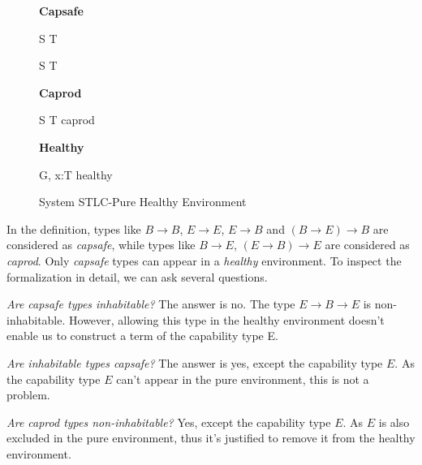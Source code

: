 \begin{figure}[h]
\begin{framed}

\setlength{\columnseprule}{0.4pt}
\begin{multicols}{2}

\textbf{Capsafe}


{ S \to T \quad {} }

{ S \to T \quad {} }

\columnbreak

\textbf{Caprod}


{ S \to T \quad caprod }

\textbf{Healthy}


{ G, \; x:T \quad healthy }


\end{multicols}
\end{framed}

\caption{System STLC-Pure Healthy Environment}
\label{fig:stlc-pure-healthy-definition}
\end{figure}

In the definition, types like $B \to B$, $E \to E$, $E \to B$ and
$(B \to E) \to B$ are considered as \emph{capsafe}, while types like
$B \to E$, $(E \to B) \to E$ are considered as \emph{caprod}. Only
\emph{capsafe} types can appear in a \emph{healthy} environment. To
inspect the formalization in detail, we can ask several questions.

\emph{Are capsafe types inhabitable?} The answer is no. The type
$E \to B \to E$ is non-inhabitable. However, allowing this type in the
healthy environment doesn't enable us to construct a term of the
capability type E.

\emph{Are inhabitable types capsafe?} The answer is yes, except the
capability type $E$. As the capability type $E$ can't appear in the
pure environment, this is not a problem.

\emph{Are caprod types non-inhabitable?} Yes, except the capability
type $E$. As $E$ is also excluded in the pure environment, thus it's
justified to remove it from the healthy environment.

